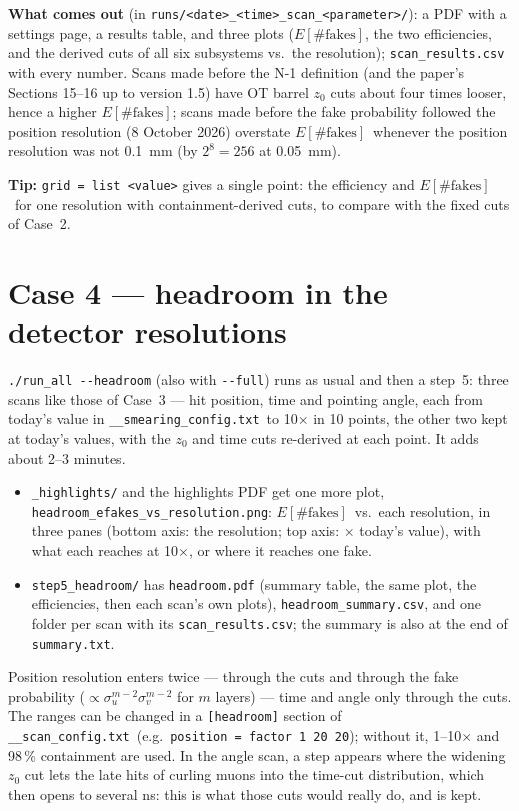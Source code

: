 \documentclass[11pt,letterpaper]{article}
\newcommand{\code}[1]{\texttt{#1}}
\newcommand{\smear}{\code{\_\_smearing\_config.txt}}
\newcommand{\scan}{\code{\_\_scan\_config.txt}}
\newcommand{\Efakes}{\ensuremath{E[\#\mathrm{fakes}]}}
\begin{document}
\textbf{What comes out} (in \code{runs/<date>\_<time>\_scan\_<parameter>/}):
a PDF with a settings page, a results table, and three plots (\Efakes,
the two efficiencies, and the derived cuts of all six subsystems vs.\ the
resolution);
\code{scan\_results.csv} with every number. Scans made before the N-1 definition (and the paper's Sections 15--16 up to
version 1.5) have OT barrel $z_0$ cuts about four times looser, hence a higher \Efakes; scans made before the fake
probability followed the position resolution (8 October 2026) overstate \Efakes\ whenever the position resolution was
not 0.1~mm (by $2^8=256$ at 0.05~mm).

\textbf{Tip:} \code{grid = list <value>} gives a single point: the
efficiency and \Efakes\ for one resolution with containment-derived cuts,
to compare with the fixed cuts of Case~2.

\section{Case 4 --- headroom in the detector resolutions}\label{sec:headroom}
\code{./run\_all -{}-headroom} (also with \code{-{}-full}) runs as usual and
then a step~5: three scans like those of Case~3 --- hit position, time and
pointing angle, each from today's value in \smear\ to 10$\times$ in 10
points, the other two kept at today's values, with the $z_0$ and time cuts
re-derived at each point. It adds about 2--3 minutes.
\begin{itemize}[leftmargin=1.2em]
\item \code{\_highlights/} and the highlights PDF get one more plot,
  \code{headroom\_efakes\_vs\_resolution.png}: \Efakes\ vs.\ each resolution,
  in three panes (bottom axis: the resolution; top axis: $\times$ today's
  value), with what each reaches at 10$\times$, or where it reaches one fake.
\item \code{step5\_headroom/} has \code{headroom.pdf} (summary table, the
  same plot, the efficiencies, then each scan's own plots),
  \code{headroom\_summary.csv}, and one folder per scan with its
  \code{scan\_results.csv}; the summary is also at the end of
  \code{summary.txt}.
\end{itemize}
Position resolution enters twice --- through the cuts and through the fake
probability ($\propto\sigma_u^{m-2}\sigma_v^{m-2}$ for $m$ layers) --- time and angle only
through the cuts. The ranges can be changed in a \code{[headroom]}
section of \scan\ (e.g.\ \code{position = factor 1 20 20}); without it,
1--10$\times$ and 98\,\% containment are used. In the angle scan, a step
appears where the widening $z_0$ cut lets the late hits of curling muons
into the time-cut distribution, which then opens to several ns: this is
what those cuts would really do, and is kept.
\end{document}
